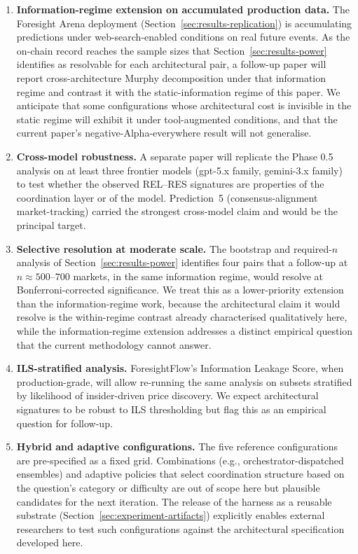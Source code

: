 \documentclass[11pt]{article}
\begin{document}
\begin{enumerate}
\item \textbf{Information-regime extension on accumulated production data.} The Foresight Arena deployment (Section~\ref{sec:results-replication}) is accumulating predictions under web-search-enabled conditions on real future events. As the on-chain record reaches the sample sizes that Section~\ref{sec:results-power} identifies as resolvable for each architectural pair, a follow-up paper will report cross-architecture Murphy decomposition under that information regime and contrast it with the static-information regime of this paper. We anticipate that some configurations whose architectural cost is invisible in the static regime will exhibit it under tool-augmented conditions, and that the current paper's negative-Alpha-everywhere result will not generalise.

\item \textbf{Cross-model robustness.} A separate paper will replicate the Phase 0.5 analysis on at least three frontier models (gpt-5.x family, gemini-3.x family) to test whether the observed REL--RES signatures are properties of the coordination layer or of the model. Prediction~5 (consensus-alignment market-tracking) carried the strongest cross-model claim and would be the principal target.

\item \textbf{Selective resolution at moderate scale.} The bootstrap and required-$n$ analysis of Section~\ref{sec:results-power} identifies four pairs that a follow-up at $n \approx 500$--$700$ markets, in the same information regime, would resolve at Bonferroni-corrected significance. We treat this as a lower-priority extension than the information-regime work, because the architectural claim it would resolve is the within-regime contrast already characterised qualitatively here, while the information-regime extension addresses a distinct empirical question that the current methodology cannot answer.

\item \textbf{ILS-stratified analysis.} ForesightFlow's Information Leakage Score, when production-grade, will allow re-running the same analysis on subsets stratified by likelihood of insider-driven price discovery. We expect architectural signatures to be robust to ILS thresholding but flag this as an empirical question for follow-up.

\item \textbf{Hybrid and adaptive configurations.} The five reference configurations are pre-specified as a fixed grid. Combinations (e.g., orchestrator-dispatched ensembles) and adaptive policies that select coordination structure based on the question's category or difficulty are out of scope here but plausible candidates for the next iteration. The release of the harness as a reusable substrate (Section~\ref{sec:experiment-artifacts}) explicitly enables external researchers to test such configurations against the architectural specification developed here.
\end{enumerate}
\end{document}
